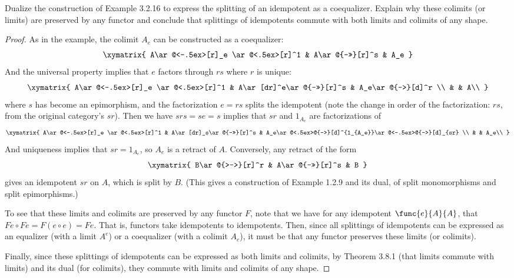 \documentclass[../../main]{subfiles}
\begin{document}
\begin{exercise}
	Dualize the construction of Example 3.2.16 to express the splitting of an
	idempotent as a coequalizer. Explain why these colimits (or limits) are
	preserved by any functor and conclude that splittings of idempotents commute
	with both limits and colimits of any shape.
\end{exercise}
\begin{proof}
	As in the example, the colimit $A_e$ can be constructed as a coequalizer:
	$$
	\xymatrix{
		A\ar@<-.5ex>[r]_e \ar@<.5ex>[r]^1 & A\ar@{->>}[r]^s & A_e
	}
	$$
	And the universal property implies that $e$ factors through $rs$ where $r$ is unique:
	$$
	\xymatrix{
		A\ar@<-.5ex>[r]_e \ar@<.5ex>[r]^1 & A\ar[dr]^e\ar@{->>}[r]^s & A_e\ar@{-->}[d]^r \\
		& & A\\
	}
	$$
	where $s$ has become an epimorphism, and the factorization $e=rs$ splits the idempotent (note the change in order of the factorization: $rs$, from the original category's $sr$). Then we have $srs = se = s$ implies that $sr$ and $1_{A_e}$ are factorizations of
	$$
	\xymatrix{
		A\ar@<-.5ex>[r]_e \ar@<.5ex>[r]^1 & A\ar[dr]_s\ar@{->>}[r]^s & A_e\ar@<.5ex>@{-->}[d]^{1_{A_e}}\ar@<-.5ex>@{-->}[d]_{sr} \\
		& & A_e\\
	}
	$$
	And uniqueness implies that $sr = 1_{A_e}$, so $A_e$ is a retract of $A$. Conversely, any retract of the form
	$$
	\xymatrix{
		B\ar@{>->}[r]^r & A\ar@{->>}[r]^s & B
	}
	$$
	gives an idempotent $sr$ on $A$, which is split by $B$. (This gives a
	construction of Example 1.2.9 and its dual, of split monomorphisms and split
	epimorphisms.)

	To see that these limits and colimits are preserved by any functor $F$, note
	that we have for any idempotent $\func{e}{A}{A}$, that $Fe\circ Fe =
	F(e\circ e) = Fe$. That is, functors take idempotents to idempotents. Then,
	since all splittings of idempotents can be expressed as an equalizer (with a
	limit $A^e$) or a coequalizer (with a colimit $A_e$), it must be that any
	functor preserves these limits (or colimits).

	Finally, since these splittings of idempotents can be expressed as both
	limits and colimits, by Theorem 3.8.1 (that limits commute with limits) and
	its dual (for colimits), they commute with limits and colimits of any shape.
\end{proof}
\end{document}
